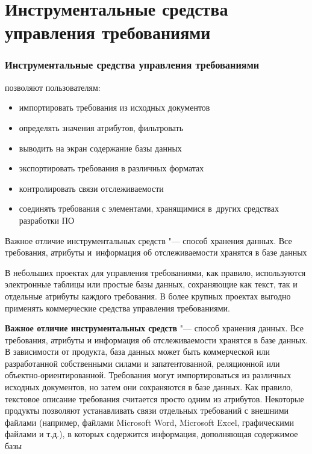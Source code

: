\documentclass{../industrial-development}
\begin{document}
\section{Инструментальные средства управления требованиями}
\begin{frame} \frametitle{Инструментальные средства управления требованиями}
позволяют пользователям:
	\begin{itemize}
\item импортировать требования из исходных документов
\item определять значения атрибутов, фильтровать
\item выводить на экран содержание базы данных
\item экспортировать требования в различных форматах
\item контролировать связи отслеживаемости
\item соединять требования с элементами, хранящимися в~других средствах разработки ПО
  	\end{itemize}
Важное отличие инструментальных средств "--- способ хранения данных. Все требования, атрибуты и~информация об отслеживаемости хранятся в базе данных
\end{frame}

\lecturenotes

В небольших проектах для управления требованиями, как правило, используются электронные таблицы или простые базы данных, сохраняющие как текст, так и отдельные атрибуты каждого требования. В более крупных проектах выгодно применять коммерческие средства управления требованиями. 

\textbf{Важное отличие инструментальных средств} "--- способ хранения данных. Все требования, атрибуты и информация об отслеживаемости хранятся в базе данных. В зависимости от продукта, база данных может быть коммерческой или разработанной собственными силами и запатентованной, реляционной или объектно-ориентированной. Требования могут импортироваться из различных исходных документов, но затем они сохраняются в базе данных. Как правило, текстовое описание требования считается просто одним из атрибутов. Некоторые продукты позволяют устанавливать связи отдельных требований с внешними файлами (например, файлами Microsoft Word, Microsoft Excel, графическими файлами и т.д.), в которых содержится информация, дополняющая содержимое базы~\cite[с.~400--401]{Wiegers}
\end{document}
